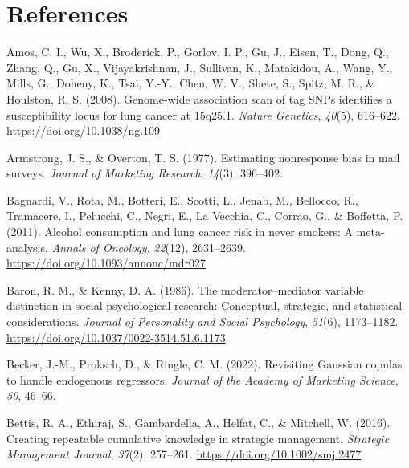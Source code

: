 \documentclass[
]{book}
\newlength{\cslhangindent}
\newenvironment{CSLReferences}[2] %
 {\begin{list}{}{%
  \setlength{\itemindent}{0pt}
  \setlength{\leftmargin}{0pt}
  \setlength{\parsep}{0pt}
  \ifodd #1
   \setlength{\leftmargin}{\cslhangindent}
   \setlength{\itemindent}{-1\cslhangindent}
  \fi
  \setlength{\itemsep}{#2\baselineskip}}}
 {\end{list}}
\begin{document}
\chapter*{References}\label{bibliography}

\protect{}\label{refs}
\begin{CSLReferences}{1}{0}
Amos, C. I., Wu, X., Broderick, P., Gorlov, I. P., Gu, J., Eisen, T., Dong, Q., Zhang, Q., Gu, X., Vijayakrishnan, J., Sullivan, K., Matakidou, A., Wang, Y., Mills, G., Doheny, K., Tsai, Y.-Y., Chen, W. V., Shete, S., Spitz, M. R., \& Houlston, R. S. (2008). Genome-wide association scan of tag {SNPs} identifies a susceptibility locus for lung cancer at 15q25.1. \emph{Nature Genetics}, \emph{40}(5), 616--622. \url{https://doi.org/10.1038/ng.109}

Armstrong, J. S., \& Overton, T. S. (1977). Estimating nonresponse bias in mail surveys. \emph{Journal of Marketing Research}, \emph{14}(3), 396--402.

Bagnardi, V., Rota, M., Botteri, E., Scotti, L., Jenab, M., Bellocco, R., Tramacere, I., Pelucchi, C., Negri, E., La Vecchia, C., Corrao, G., \& Boffetta, P. (2011). Alcohol consumption and lung cancer risk in never smokers: A meta-analysis. \emph{Annals of Oncology}, \emph{22}(12), 2631--2639. \url{https://doi.org/10.1093/annonc/mdr027}

Baron, R. M., \& Kenny, D. A. (1986). The moderator--mediator variable distinction in social psychological research: Conceptual, strategic, and statistical considerations. \emph{Journal of Personality and Social Psychology}, \emph{51}(6), 1173--1182. \url{https://doi.org/10.1037/0022-3514.51.6.1173}

Becker, J.-M., Proksch, D., \& Ringle, C. M. (2022). Revisiting {Gaussian} copulas to handle endogenous regressors. \emph{Journal of the Academy of Marketing Science}, \emph{50}, 46--66.

Bettis, R. A., Ethiraj, S., Gambardella, A., Helfat, C., \& Mitchell, W. (2016). Creating repeatable cumulative knowledge in strategic management. \emph{Strategic Management Journal}, \emph{37}(2), 257--261. \url{https://doi.org/10.1002/smj.2477}


\end{CSLReferences}
\end{document}
